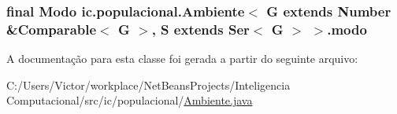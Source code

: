 \hypertarget{classic_1_1populacional_1_1_ambiente_3_01_g_01extends_01_number_01_6_comparable_3_01_g_01_4_00_01a5eb548f12ccc7dbff4cf5c498ddc51_afdf6b3d04203015a78f9af1012306dff}{
\subsubsection[{modo}]{\setlength{\rightskip}{0pt plus 5cm}final Modo ic.\-populacional.\-Ambiente$<$ G extends Number \&Comparable$<$ G $>$, S extends Ser$<$ G $>$ $>$.modo\hspace{0.3cm}{\ttfamily [private]}}}\label{classic_1_1populacional_1_1_ambiente_3_01_g_01extends_01_number_01_6_comparable_3_01_g_01_4_00_01a5eb548f12ccc7dbff4cf5c498ddc51_afdf6b3d04203015a78f9af1012306dff}


A documentação para esta classe foi gerada a partir do seguinte arquivo\-:\begin{DoxyCompactItemize}
\item 
C\-:/\-Users/\-Victor/workplace/\-Net\-Beans\-Projects/\-Inteligencia Computacional/src/ic/populacional/\hyperlink{_ambiente_8java}{Ambiente.\-java}\end{DoxyCompactItemize}
